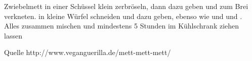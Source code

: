 \begin{recipe}{Zwiebelmett}
	 in einer Schüssel klein zerbröseln, dann
	 dazu geben und zum Brei verkneten. 
	 in kleine Würfel schneiden und dazu geben, ebenso wie
	 und 
	 und 
	. Alles zusammen mischen und mindestens 5 Stunden im Kühlschrank ziehen lassen
	\item[Quelle] http://www.veganguerilla.de/mett-mett-mett/
\end{recipe}